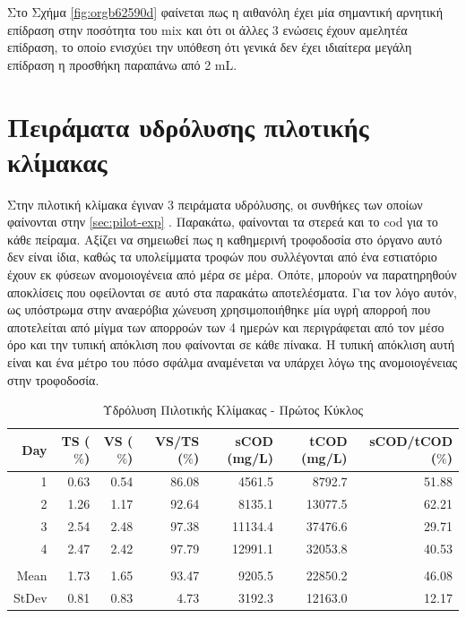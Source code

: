 \documentclass[11pt]{report}
\begin{document}
Στο Σχήμα \ref{fig:orgb62590d} φαίνεται πως η αιθανόλη έχει μία σημαντική αρνητική επίδραση στην ποσότητα του \acrshort{mix} και ότι οι άλλες 3 ενώσεις έχουν αμελητέα επίδραση, το οποίο ενισχύει την υπόθεση ότι γενικά δεν έχει ιδιαίτερα μεγάλη επίδραση η προσθήκη παραπάνω από 2 mL.

\section{Πειράματα υδρόλυσης πιλοτικής κλίμακας}
\label{sec:org07d99bc}
Στην πιλοτική κλίμακα έγιναν 3 πειράματα υδρόλυσης, οι συνθήκες των οποίων φαίνονται στην \autoref{sec:pilot-exp} . Παρακάτω, φαίνονται τα στερεά και το \acrshort{cod} για το κάθε πείραμα. Αξίζει να σημειωθεί πως η καθημερινή τροφοδοσία στο όργανο αυτό δεν είναι ίδια, καθώς τα υπολείμματα τροφών που συλλέγονται από ένα εστιατόριο έχουν εκ φύσεων ανομοιογένεια από μέρα σε μέρα. Οπότε, μπορούν να παρατηρηθούν αποκλίσεις που οφείλονται σε αυτό στα παρακάτω αποτελέσματα. Για τον λόγο αυτόν, ως υπόστρωμα στην αναερόβια χώνευση χρησιμοποιήθηκε μία υγρή απορροή που αποτελείται από μίγμα των απορροών των 4 ημερών και περιγράφεται από τον μέσο όρο και την τυπική απόκλιση που φαίνονται σε κάθε πίνακα. Η τυπική απόκλιση αυτή είναι και ένα μέτρο του πόσο σφάλμα αναμένεται να υπάρχει λόγω της ανομοιογένειας στην τροφοδοσία.

\begin{table}[htbp]
\caption{\label{tab:org00e25e0}Υδρόλυση Πιλοτικής Κλίμακας - Πρώτος Κύκλος}
\centering
\begin{tabular}{rrrrrrr}
Day & TS (\(\%\)) & VS (\(\%\)) & VS/TS (\(\%\)) & sCOD (mg/L) & tCOD (mg/L) & sCOD/tCOD (\(\%\))\\[0pt]
\hline
1 & 0.63 & 0.54 & 86.08 & 4561.5 & 8792.7 & 51.88\\[0pt]
2 & 1.26 & 1.17 & 92.64 & 8135.1 & 13077.5 & 62.21\\[0pt]
3 & 2.54 & 2.48 & 97.38 & 11134.4 & 37476.6 & 29.71\\[0pt]
4 & 2.47 & 2.42 & 97.79 & 12991.1 & 32053.8 & 40.53\\[0pt]
 &  &  &  &  &  & \\[0pt]
Mean & 1.73 & 1.65 & 93.47 & 9205.5 & 22850.2 & 46.08\\[0pt]
StDev & 0.81 & 0.83 & 4.73 & 3192.3 & 12163.0 & 12.17\\[0pt]
\end{tabular}
\end{table}
\end{document}

